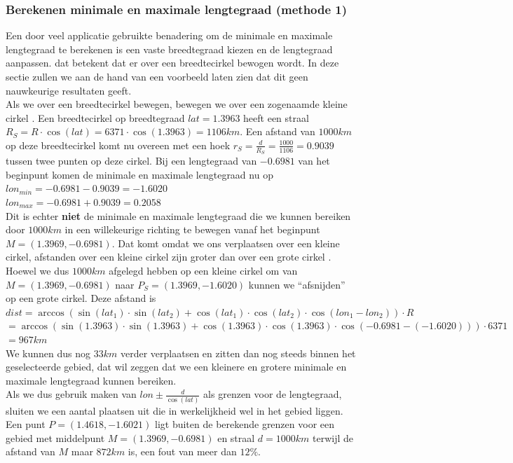 \documentclass[twoside,openright]{uva-bachelor-thesis}
\begin{document}
		\subsubsection{Berekenen minimale en maximale lengtegraad (methode 1)}
		Een door veel applicatie gebruikte benadering om de minimale en maximale lengtegraad te berekenen is een vaste breedtegraad kiezen en de lengtegraad aanpassen. dat betekent dat er over een breedtecirkel \cite{circlelat} bewogen wordt. In deze sectie zullen we aan de hand van een voorbeeld laten zien dat dit geen nauwkeurige resultaten geeft.
		\\[0.5cm]
		Als we over een breedtecirkel bewegen, bewegen we over een zogenaamde kleine cirkel \cite{circlesphere}. Een breedtecirkel op breedtegraad $lat = 1.3963$ heeft een straal $R_{S} = R \cdot \cos(lat) = 6371 \cdot \cos(1.3963) = 1106km$. Een afstand van $1000km$ op deze breedtecirkel komt nu overeen met een hoek $r_{S} = \frac{d}{R_{S}} = \frac{1000}{1106} = 0.9039$ tussen twee punten op deze cirkel. Bij een lengtegraad van $-0.6981$ van het beginpunt komen de minimale en maximale lengtegraad nu op
		\\[0.5cm]
		$lon_{min} = -0.6981 - 0.9039 = -1.6020$\\
		$lon_{max} = -0.6981 + 0.9039 = 0.2058$\\[0.5cm]
		Dit is echter \textbf{niet} de minimale en maximale lengtegraad die we kunnen bereiken door $1000km$ in een willekeurige richting te bewegen vanaf het beginpunt $M = (1.3969, -0.6981)$. Dat komt omdat we ons verplaatsen over een kleine cirkel, afstanden over een kleine cirkel zijn groter dan over een grote cirkel \cite{greatcircle}. Hoewel we dus $1000km$ afgelegd hebben op een kleine cirkel om van $M = (1.3969, -0.6981)$ naar $P_{S} = (1.3969, -1.6020)$ kunnen we ``afsnijden'' op een grote cirkel. Deze afstand is\\[0.5cm]		
		$dist = \arccos(\sin(lat_1) \cdot \sin(lat_2) + \cos(lat_1) \cdot \cos(lat_2) \cdot \cos(lon_1 - lon_2)) \cdot R$\\
		$= \arccos(\sin(1.3963) \cdot \sin(1.3963) + \cos(1.3963) \cdot \cos(1.3963) \cdot \cos(-0.6981 - (-1.6020))) \cdot 6371$\\
		$= 967km$\\[0.5cm]
		We kunnen dus nog $33km$ verder verplaatsen en zitten dan nog steeds binnen het geselecteerde gebied, dat wil zeggen dat we een kleinere en grotere minimale en maximale lengtegraad kunnen bereiken.\\[0.5cm]
		Als we dus gebruik maken van $lon \pm \frac{d}{\cos(lat)}$ als grenzen voor de lengtegraad, sluiten we een aantal plaatsen uit die in werkelijkheid wel in het gebied liggen. Een punt $P = (1.4618, -1.6021)$ ligt buiten de berekende grenzen voor een gebied met middelpunt $M = (1.3969, -0.6981)$ en straal $d = 1000km$  terwijl de afstand van $M$ maar $872km$ is, een fout van meer dan $12\%$.
\end{document}
